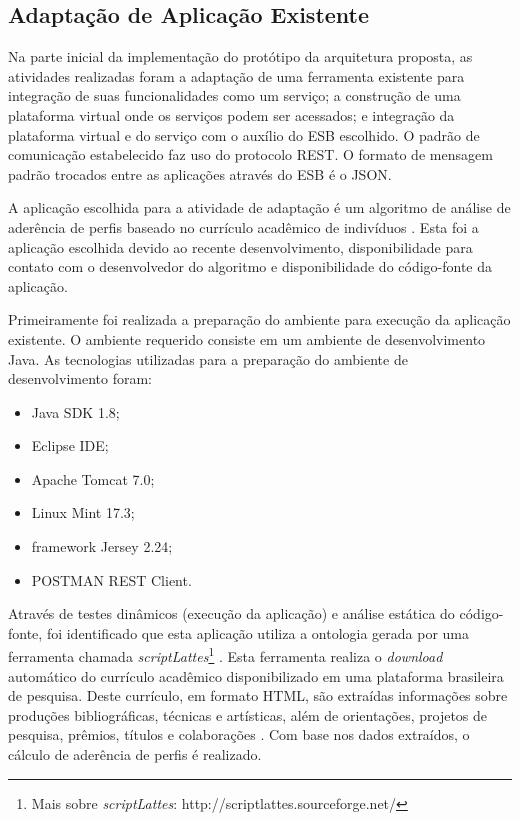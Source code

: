 \subsection{Adaptação de Aplicação Existente}
Na parte inicial da implementação do protótipo da arquitetura proposta, as atividades realizadas foram a adaptação de uma ferramenta existente para integração de suas funcionalidades como um serviço; a construção de uma plataforma virtual onde os serviços podem ser acessados; e integração da plataforma virtual e do serviço com o auxílio do ESB escolhido. O padrão de comunicação estabelecido faz uso do protocolo REST. O formato de mensagem padrão trocados entre as aplicações através do ESB é o JSON.

A aplicação escolhida para a atividade de adaptação é um algoritmo de análise de aderência de perfis baseado no currículo acadêmico de indivíduos \cite{jesus_algoritmo_2014}. Esta foi a aplicação escolhida devido ao recente desenvolvimento, disponibilidade para contato com o desenvolvedor do algoritmo e disponibilidade do código-fonte da aplicação.

Primeiramente foi realizada a preparação do ambiente para execução da aplicação existente. O ambiente requerido consiste em um ambiente de desenvolvimento Java. As tecnologias utilizadas para a preparação do ambiente de desenvolvimento foram:
\begin{itemize}
\item Java SDK 1.8;
\item Eclipse IDE;
\item Apache Tomcat 7.0;
\item Linux Mint 17.3;
\item framework Jersey 2.24;
\item POSTMAN REST Client.
\end{itemize}

Através de testes dinâmicos (execução da aplicação) e análise estática do código-fonte, foi identificado que esta aplicação utiliza a ontologia gerada por uma ferramenta chamada \textit{scriptLattes}\footnote{Mais sobre \textit{scriptLattes}: http://scriptlattes.sourceforge.net/} . Esta ferramenta realiza o \textit{download} automático do currículo acadêmico disponibilizado em uma plataforma brasileira de pesquisa. Deste currículo, em formato HTML, são extraídas informações sobre produções bibliográficas, técnicas e artísticas, além de orientações, projetos de pesquisa, prêmios, títulos e colaborações \cite{scriptlattes_2009}. Com base nos dados extraídos, o cálculo de aderência de perfis é realizado.

